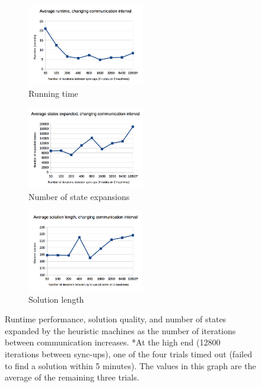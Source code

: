 \documentclass{article}
\begin{document}
\begin{figure}
\centering
\begin{subfigure}{2.0in}
  \includegraphics[width=2.0in]{graphs/commfreq_runningtime}
  \caption{Running time}
  \label{fig:commfreq_runtime}
\end{subfigure}
\begin{subfigure}{2.0in}
  \includegraphics[width=2.0in]{graphs/commfreq_expansions}
  \caption{Number of state expansions}
  \label{fig:commfreq_expansions}
\end{subfigure}
\begin{subfigure}{2.0in}
  \includegraphics[width=2.0in]{graphs/commfreq_solutionquality}
  \caption{Solution length}
  \label{fig:nummachines_solnqual}
\end{subfigure}
\caption{Runtime performance, solution quality, and number of states expanded by the heuristic machines as the number of iterations between communication increases. *At the high end (12800 iterations between sync-ups), one of the four trials timed out (failed to find a solution within 5 minutes). The values in this graph are the average of the remaining three trials.}
\label{fig:commfreq}
\end{figure}
\end{document}
